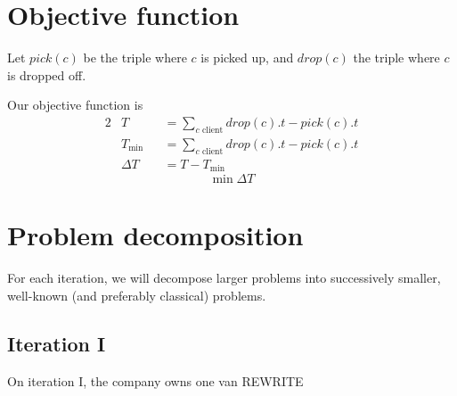 \section{Objective function}
Let $pick(c)$ be the triple where $c$ is picked up, and $drop(c)$ the triple where $c$ is dropped off.\par
Our objective function is
\begin{alignat*}{2}
    & T        &&= \sum_{c \text{ client}}{drop(c).t - pick(c).t} \\
    & T_{\min} &&= \sum_{c \text{ client}}{drop(c).t - pick(c).t} \\
    & \Delta T &&= T - T_{\min}
\end{alignat*}
\begin{equation*}
    \min \Delta T
\end{equation*}
\section{Problem decomposition}
For each iteration, we will decompose larger problems into successively smaller, well-known (and preferably classical) problems.
\subsection{Iteration I}
On iteration I, the company owns one van REWRITE
